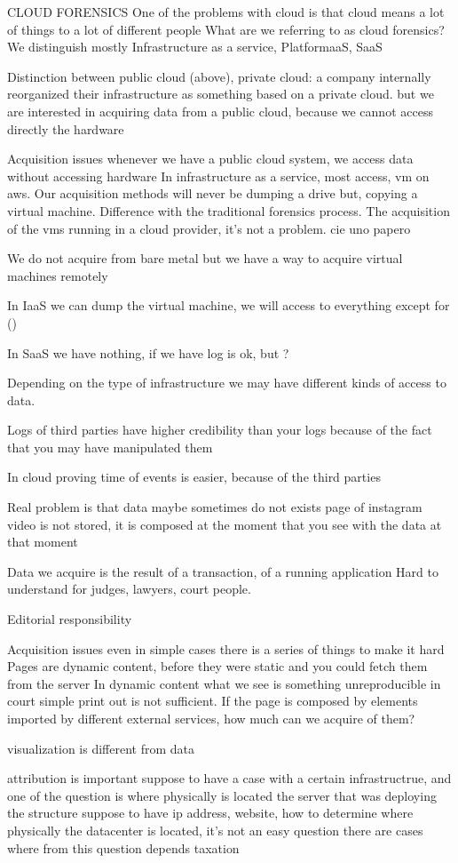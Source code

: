 CLOUD FORENSICS 
    One of the problems with cloud is that cloud means a lot of things to a lot of different people 
    What are we referring to as cloud forensics?
        We distinguish mostly Infrastructure as a service, PlatformaaS, SaaS

    Distinction between public cloud (above), private cloud: a company internally reorganized their infrastructure as something based on a private cloud.
    but we are interested in acquiring data from a public cloud, because we cannot access directly the hardware 

    Acquisition issues 
        whenever we have a public cloud system, we access data without accessing hardware 
        In infrastructure as a service, most access, vm on aws. 
        Our acquisition methods will never be dumping a drive but, copying a virtual machine.
        Difference with the traditional forensics process.
        The acquisition of the vms running in a cloud provider, it's not a problem. cie uno papero 

        We do not acquire from bare metal but we have a way to acquire virtual machines remotely 
        
        In IaaS we can dump the virtual machine, we will access to everything except for ()
        
        In SaaS we have nothing, if we have log is ok, but ?

        Depending on the type of infrastructure we may have different kinds of access to data.

        Logs of third parties have higher credibility than your logs because of the fact that you may have manipulated them

        In cloud proving time of events is easier, because of the third parties 

Real problem is that data maybe sometimes do not exists 
    page of instagram video is not stored, it is composed at the moment that you see 
    with the data at that moment 

    Data we acquire is the result of a transaction, of a running application   
    Hard to understand for judges, lawyers, court people.

    Editorial responsibility 

Acquisition issues 
    even in simple cases there is a series of things to make it hard 
    Pages are dynamic content, before they were static and you could fetch them from the server 
    In dynamic content what we see is something unreproducible in court 
    simple print out is not sufficient.
    If the page is composed by elements imported by different external services, how much can we acquire of them?


    visualization is different from data 
    
    attribution is important 
        suppose to have a case with a certain infrastructrue, and one of the question is where physically is located the server that was deploying the structure 
        suppose to have ip address, website, how to determine where physically the datacenter is located, it's not an easy question 
        there are cases where from this question depends taxation 
        



